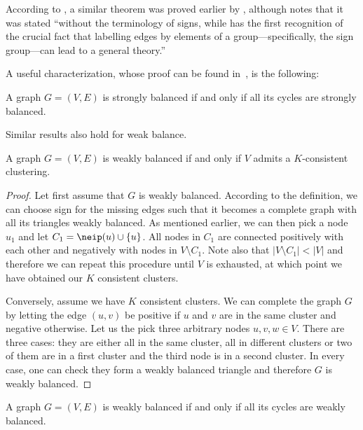\begin{aside}
According to \textcite{Huffner2010}, a similar theorem was proved earlier by \textcite[Theorem
X.11]{Konig36}, although \textcite{Zaslavsky2012} notes that it was stated \enquote{without the
terminology of signs, while \autocite{harary1953} has the first recognition of the crucial fact that
labelling edges by elements of a group---specifically, the sign group---can lead to a general
theory.}
\end{aside}

A useful characterization, whose proof can be found in~\autocite[page 122]{BookKleinberg2010}, is the
following:
\begin{theorem}
  A graph $G=(V,E)$ is strongly balanced if and only if all its cycles are strongly balanced.
\end{theorem}

Similar results also hold for weak balance.
\begin{theorem}
  A graph $G=(V,E)$ is weakly balanced if and only if $V$ admits a $K$-consistent clustering.
\end{theorem}
\begin{proof}
  Let first assume that $G$ is weakly balanced. According to the definition, we can choose sign for
  the missing edges such that it becomes a complete graph with all its triangles weakly balanced. As
  mentioned earlier, we can then pick a node $u_1$ and let $C_1 = \neip(u) \cup \{u\}$. All
  nodes in $C_1$ are connected positively with each other and negatively with nodes in $V\setminus
  C_1$. Note also that $|V\setminus C_1| < |V|$ and therefore we can repeat this
  procedure until $V$ is exhausted, at which point we have obtained our $K$ consistent clusters.

  Conversely, assume we have $K$ consistent clusters. We can complete the graph $G$ by letting the edge
  $(u,v)$ be positive if $u$ and $v$ are in the same cluster and negative otherwise. Let us the pick
  three arbitrary nodes $u,v,w\in V$. There are three cases: they are either all in the same
  cluster, all in different clusters or two of them are in a first cluster and the third node is in
  a second cluster. In every case, one can check they form a weakly balanced triangle and therefore
  $G$ is weakly balanced.
\end{proof}
\begin{theorem}
  A graph $G=(V,E)$ is weakly balanced if and only if all its cycles are weakly balanced.
\end{theorem}


